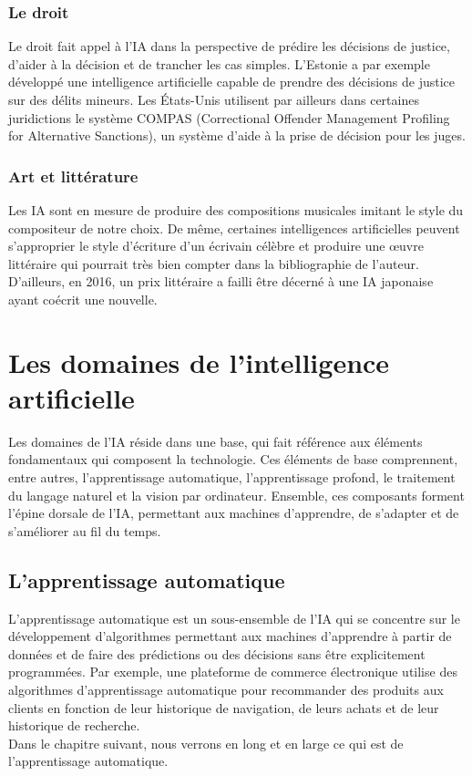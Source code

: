 \subsubsection{Le droit} Le droit fait appel à l'IA dans la perspective de prédire les décisions de justice, d'aider à la décision et de trancher les cas simples. L'Estonie a par exemple développé une intelligence artificielle capable de prendre des décisions de justice sur des délits mineurs. Les États-Unis utilisent par ailleurs dans certaines juridictions le système COMPAS (Correctional Offender Management Profiling for Alternative Sanctions), un système d'aide à la prise de décision pour les juges. 

\subsubsection{Art et littérature} Les IA sont en mesure de produire des compositions musicales imitant le style du compositeur de notre choix. De même, certaines intelligences artificielles peuvent s’approprier le style d’écriture d’un écrivain célèbre et produire une œuvre littéraire qui pourrait très bien compter dans la bibliographie de l’auteur. D’ailleurs, en 2016, un prix littéraire a failli être décerné à une IA japonaise ayant coécrit une nouvelle.

\section{Les domaines de l'intelligence artificielle}
Les domaines de l’IA réside dans une base, qui fait référence aux éléments fondamentaux qui composent la technologie. Ces éléments de base comprennent, entre autres, l’apprentissage automatique, l'apprentissage profond, le traitement du langage naturel et la vision par ordinateur. Ensemble, ces composants forment l’épine dorsale de l’IA, permettant aux machines d’apprendre, de s’adapter et de s’améliorer au fil du temps.

\subsection{L'apprentissage automatique}
L'apprentissage automatique est un sous-ensemble de l'IA qui se concentre sur le développement d'algorithmes permettant aux machines d'apprendre à partir de données et de faire des prédictions ou des décisions sans être explicitement programmées. Par exemple, une plateforme de commerce électronique utilise des algorithmes d’apprentissage automatique pour recommander des produits aux clients en fonction de leur historique de navigation, de leurs achats et de leur historique de recherche. \\
Dans le chapitre suivant, nous verrons en long et en large ce qui est de l'apprentissage automatique.

